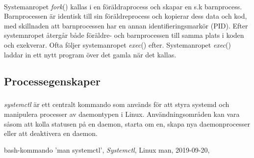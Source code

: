 \paragraph{}
Systemanropet \emph{fork}() kallas i en föräldraprocess och skapar en s.k barnprocess. Barnprocessen är identisk till sin föräldreprocess och kopierar dess data och kod, med skillnaden att barnprocessen har en annan identifieringsmarkör (PID). Efter systemnropet återgår både föräldre- och barnprocessen till samma plats i koden och exekverar. 
Ofta följer systemanropet \emph{exec}() efter. Systemanropet \emph{exec}() laddar in ett nytt program över det gamla när det kallas. 
\subsection{Processegenskaper}
\subparagraph{}
\emph{systemctl} är ett centralt kommando som används för att styra systemd och manipulera processer av daemontypen i Linux. Användningsområden kan vara såsom att kolla statusen på en daemon, starta om en, skapa nya daemonprocesser eller att deaktivera en daemon.\cite{man}
\begin{thebibliography}{999}

            bash-kommando 'man systemctl',
                        \emph{Systemctl},
                                        Linux man,
                                                            2019-09-20,
                                                            \end{thebibliography}
